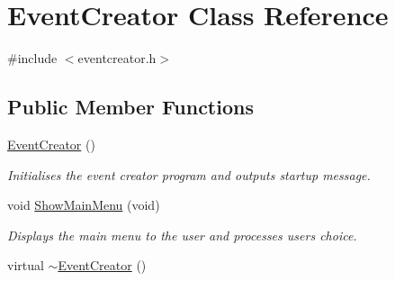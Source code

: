 \hypertarget{classEventCreator}{\section{\-Event\-Creator \-Class \-Reference}
\label{classEventCreator}
}


{\ttfamily \#include $<$eventcreator.\-h$>$}

\subsection*{\-Public \-Member \-Functions}
\begin{DoxyCompactItemize}
\item 
\hyperlink{classEventCreator_a23adb753ff46c970018641ba6cd8ad04}{\-Event\-Creator} ()
\begin{DoxyCompactList}\small\item\em \-Initialises the event creator program and outputs startup message. \end{DoxyCompactList}\item 
void \hyperlink{classEventCreator_a0b1f77352fb2ee059087e319ec1c007d}{\-Show\-Main\-Menu} (void)
\begin{DoxyCompactList}\small\item\em \-Displays the main menu to the user and processes users choice. \end{DoxyCompactList}\item 
virtual \hyperlink{classEventCreator_a3e1b2dde8d5979b26019e30fe70b3a96}{$\sim$\-Event\-Creator} ()
\end{DoxyCompactItemize}
